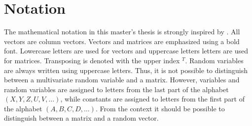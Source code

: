 \section*{Notation}

The mathematical notation in this master's thesis is strongly inspired by \cite{Madsen_2010}. All vectors are column vectors. Vectors and matrices are emphasized using a bold font. Lowercase letters are used for vectors and uppercase letters letters are used for matrices. Transposing is denoted with the upper index $^T$. Random variables are always written using uppercase letters. Thus, it is not possible to distinguish between a multivariate random variable and a matrix. However, variables and random variables are assigned to letters from the last part of the alphabet $(X, Y, Z, U, V, \dots)$, while constants are assigned to letters from the first part of the alphabet $(A, B, C, D, \dots)$. From the context it should be possible to distinguish between a matrix and a random vector.